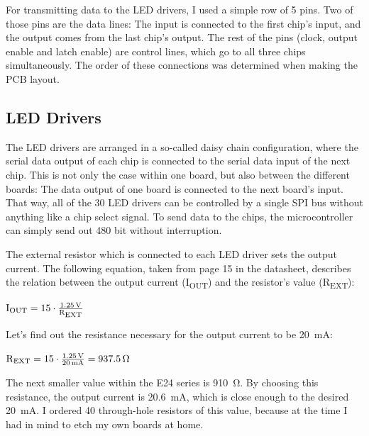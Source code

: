 \documentclass[a4paper, 11pt, titlepage]{report}
\newenvironment{ownmath}
{\vspace{2mm}\hspace{15pt}\begin{math}}
{\end{math}\vspace{2mm}}
\begin{document}
For transmitting data to the LED drivers, I used a simple row of 5 pins. Two of those pins are the
data lines: The input is connected to the first chip's input, and the output comes from the last
chip's output. The rest of the pins (clock, output enable and latch enable) are control lines,
which go to all three chips simultaneously. The order of these connections was determined when
making the PCB layout.

\subsection{LED Drivers}

The LED drivers are arranged in a so-called daisy chain configuration, where the serial data
output of each chip is connected to the serial data input of the next chip. This is not only the
case within one board, but also between the different boards: The data output of one board is
connected to the next board's input. That way, all of the 30 LED drivers can be controlled by a
single SPI bus without anything like a chip select signal. To send data to the chips, the
microcontroller can simply send out 480 bit without interruption.

\def \iout {I\textsubscript{OUT}}
\def \rext {R\textsubscript{EXT}}

The external resistor which is connected to each LED driver sets the output
current. The following equation, taken from page 15 in the datasheet, describes the relation
between the output current (\iout) and the resistor's value (\rext):

\begin{ownmath}
\textrm{\iout} = 15 \cdot \frac{\SI{1.25}{\volt}}{\si{\rext}}
\end{ownmath}

Let's find out the resistance necessary for the output current to be \SI{20}{\milli\ampere}:

\begin{ownmath}
\textrm{\rext} = 15 \cdot \frac{\SI{1.25}{\volt}}{\SI{20}{\milli\ampere}} = \SI{937.5}{\ohm}
\end{ownmath}

The next smaller value within the E24 series is \SI{910}{\ohm}. By choosing this resistance, the
output current is \SI{20.6}{\milli\ampere}, which is close enough to the desired
\SI{20}{\milli\ampere}. I ordered 40 through-hole resistors of this value, because at the time I
had in mind to etch my own boards at home.
\end{document}
